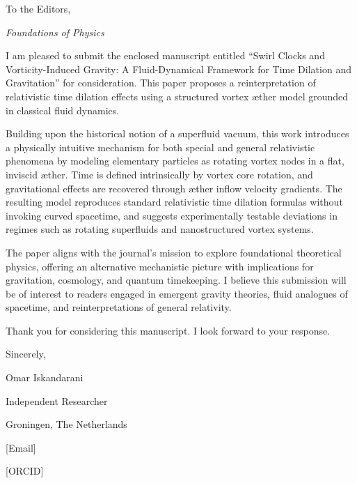 
To the Editors,

\textit{Foundations of Physics}


I am pleased to submit the enclosed manuscript entitled “Swirl Clocks and Vorticity-Induced Gravity: A Fluid-Dynamical Framework for Time Dilation and Gravitation” for consideration. This paper proposes a reinterpretation of relativistic time dilation effects using a structured vortex æther model grounded in classical fluid dynamics.


Building upon the historical notion of a superfluid vacuum, this work introduces a physically intuitive mechanism for both special and general relativistic phenomena by modeling elementary particles as rotating vortex nodes in a flat, inviscid æther. Time is defined intrinsically by vortex core rotation, and gravitational effects are recovered through æther inflow velocity gradients. The resulting model reproduces standard relativistic time dilation formulas without invoking curved spacetime, and suggests experimentally testable deviations in regimes such as rotating superfluids and nanostructured vortex systems.


The paper aligns with the journal’s mission to explore foundational theoretical physics, offering an alternative mechanistic picture with implications for gravitation, cosmology, and quantum timekeeping. I believe this submission will be of interest to readers engaged in emergent gravity theories, fluid analogues of spacetime, and reinterpretations of general relativity.


Thank you for considering this manuscript. I look forward to your response.


Sincerely,

Omar Iskandarani

Independent Researcher

Groningen, The Netherlands

[Email]

[ORCID]